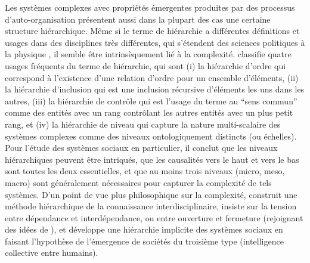 \documentclass[english,fleqn,allpages]{ISTE_science}[2018/07/30]
\begin{document}
{Les systèmes complexes avec propriétés émergentes produites par des processus d'auto-organisation présentent aussi dans la plupart des cas une certaine structure hiérarchique. Même si le terme de hiérarchie a différentes définitions et usages dans des disciplines très différentes, qui s'étendent des sciences politiques \citep{crumley1987dialectical} à la physique \citep{10.1371/journal.pone.0033799}, il semble être intrinsèquement lié à la complexité. \cite{lane2006hierarchy} classifie quatre usages fréquents du terme de hiérarchie, qui sont (i) la hiérarchie d'ordre qui correspond à l'existence d'une relation d'ordre pour un ensemble d'éléments, (ii) la hiérarchie d'inclusion qui est une inclusion récursive d'éléments les uns dans les autres, (iii) la hiérarchie de contrôle qui est l'usage du terme au ``sens commun'' comme des entités avec un rang contrôlant les autres entités avec un plus petit rang, et (iv) la hiérarchie de niveau qui capture la nature multi-scalaire des systèmes complexes comme des niveaux ontologiquement distincts (ou échelles). Pour l'étude des systèmes sociaux en particulier, il conclut que les niveaux hiérarchiques peuvent être intriqués, que les causalités vers le haut et vers le bas sont toutes les deux essentielles, et que au moins trois niveaux (micro, meso, macro) sont généralement nécessaires pour capturer la complexité de tels systèmes. D'un point de vue plus philosophique sur la complexité, \cite{morin1980methode} construit une méthode hiérarchique de la connaissance interdisciplinaire, insiste sur la tension entre dépendance et interdépendance, ou entre ouverture et fermeture (rejoignant des idées de \cite{holland2012signals}), et développe une hiérarchie implicite des systèmes sociaux en faisant l'hypothèse de l'émergence de sociétés du troisième type (intelligence collective entre humains).
}
\end{document}
